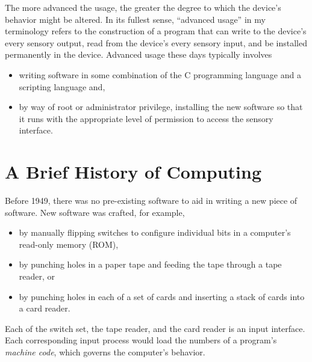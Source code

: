 \documentclass[twocolumn]{book}
\begin{document}
The more advanced the usage, the greater the degree to which the device's
behavior might be altered.  In its fullest sense, ``advanced usage'' in my
terminology refers to the construction of a program that can write to the
device's every sensory output, read from the device's every sensory input, and
be installed permanently in the device.  Advanced usage these days typically
involves
\begin{itemize}
   \item writing software in some combination of the C programming language and
      a scripting language and,
   \item by way of root or administrator privilege, installing the new software
      so that it runs with the appropriate level of permission to access the
      sensory interface.
\end{itemize}

\section{A Brief History of Computing}

Before 1949, there was no pre-existing software to aid in writing a new piece
of software.  New software was crafted, for example,
\begin{itemize}
   \item by manually flipping switches to configure individual bits in a
      computer's read-only memory (ROM),
   \item by punching holes in a paper tape and feeding the tape through a tape
      reader, or
   \item by punching holes in each of a set of cards and inserting a stack of
      cards into a card reader.
\end{itemize}
Each of the switch set, the tape reader, and the card reader is an input
interface.  Each corresponding input process would load the numbers of a
program's \emph{machine code}, which governs the computer's behavior.
\end{document}

